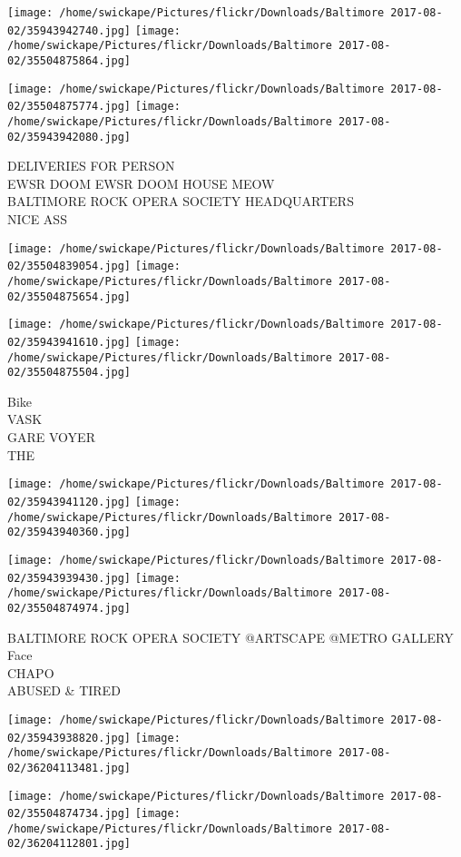 \documentclass[10pt,letterpaper]{article}
\begin{document}
\texttt{[image: /home/swickape/Pictures/flickr/Downloads/Baltimore 2017-08-02/35943942740.jpg]}
\texttt{[image: /home/swickape/Pictures/flickr/Downloads/Baltimore 2017-08-02/35504875864.jpg]}

\texttt{[image: /home/swickape/Pictures/flickr/Downloads/Baltimore 2017-08-02/35504875774.jpg]}
\texttt{[image: /home/swickape/Pictures/flickr/Downloads/Baltimore 2017-08-02/35943942080.jpg]}

DELIVERIES FOR PERSON\\
EWSR DOOM EWSR DOOM HOUSE MEOW\\
BALTIMORE ROCK OPERA SOCIETY HEADQUARTERS\\
NICE ASS
\pagebreak

\texttt{[image: /home/swickape/Pictures/flickr/Downloads/Baltimore 2017-08-02/35504839054.jpg]}
\texttt{[image: /home/swickape/Pictures/flickr/Downloads/Baltimore 2017-08-02/35504875654.jpg]}

\texttt{[image: /home/swickape/Pictures/flickr/Downloads/Baltimore 2017-08-02/35943941610.jpg]}
\texttt{[image: /home/swickape/Pictures/flickr/Downloads/Baltimore 2017-08-02/35504875504.jpg]}

Bike\\
VASK\\
GARE VOYER\\
THE
\pagebreak

\texttt{[image: /home/swickape/Pictures/flickr/Downloads/Baltimore 2017-08-02/35943941120.jpg]}
\texttt{[image: /home/swickape/Pictures/flickr/Downloads/Baltimore 2017-08-02/35943940360.jpg]}

\texttt{[image: /home/swickape/Pictures/flickr/Downloads/Baltimore 2017-08-02/35943939430.jpg]}
\texttt{[image: /home/swickape/Pictures/flickr/Downloads/Baltimore 2017-08-02/35504874974.jpg]}

BALTIMORE ROCK OPERA SOCIETY @ARTSCAPE @METRO GALLERY\\
Face\\
CHAPO\\
ABUSED \& TIRED
\pagebreak

\texttt{[image: /home/swickape/Pictures/flickr/Downloads/Baltimore 2017-08-02/35943938820.jpg]}
\texttt{[image: /home/swickape/Pictures/flickr/Downloads/Baltimore 2017-08-02/36204113481.jpg]}

\texttt{[image: /home/swickape/Pictures/flickr/Downloads/Baltimore 2017-08-02/35504874734.jpg]}
\texttt{[image: /home/swickape/Pictures/flickr/Downloads/Baltimore 2017-08-02/36204112801.jpg]}
\end{document}
